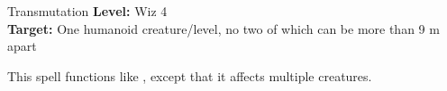 {Transmutation}
{
	\textbf{Level:}
	Wiz 4\\
	\textbf{Target:}
	One humanoid creature/level, no two of which can be more than 9 m apart\\
}
{
	This spell functions like , except that it affects multiple creatures.

}
